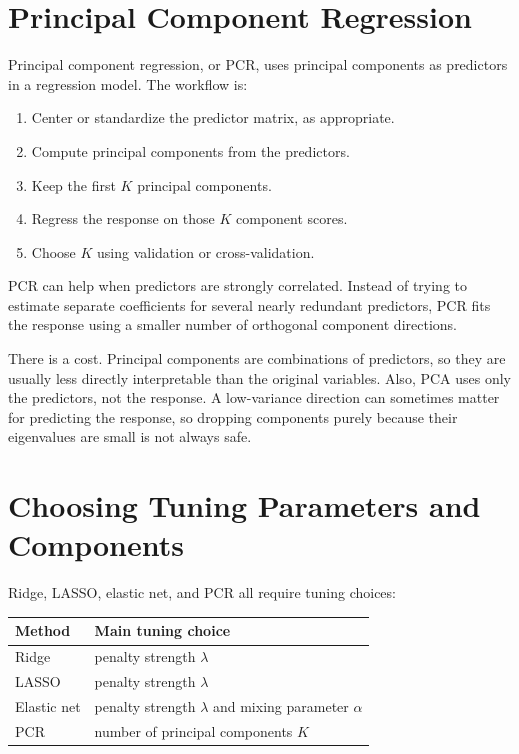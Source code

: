 \section{Principal Component Regression}

Principal component regression, or PCR, uses principal components as predictors in a regression model.  The workflow is:
\begin{enumerate}
  \item Center or standardize the predictor matrix, as appropriate.
  \item Compute principal components from the predictors.
  \item Keep the first \(K\) principal components.
  \item Regress the response on those \(K\) component scores.
  \item Choose \(K\) using validation or cross-validation.
\end{enumerate}

PCR can help when predictors are strongly correlated.  Instead of trying to estimate separate coefficients for several nearly redundant predictors, PCR fits the response using a smaller number of orthogonal component directions.

There is a cost.  Principal components are combinations of predictors, so they are usually less directly interpretable than the original variables.  Also, PCA uses only the predictors, not the response.  A low-variance direction can sometimes matter for predicting the response, so dropping components purely because their eigenvalues are small is not always safe.

\section{Choosing Tuning Parameters and Components}

Ridge, LASSO, elastic net, and PCR all require tuning choices:
\begin{center}
\begin{tabular}{p{}p{}}
\toprule
\textbf{Method} & \textbf{Main tuning choice} \\
\midrule
Ridge & penalty strength \(\lambda\) \\
LASSO & penalty strength \(\lambda\) \\
Elastic net & penalty strength \(\lambda\) and mixing parameter \(\alpha\) \\
PCR & number of principal components \(K\) \\
\bottomrule
\end{tabular}
\end{center}

